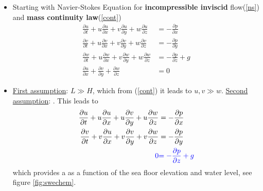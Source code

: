 \begin{frame}
\vspace{-3mm}
\begin{itemize}
\item<2-> Starting with Navier-Stokes Equation for \textbf{incompressible inviscid} flow(\ref{ns}) and \textbf{mass continuity law}(\ref{cont})
\begin{align}
\frac{\partial u}{\partial t} + u\frac{\partial u}{\partial x} + v\frac{\partial u}{\partial y} + w\frac{\partial u}{\partial z} &= - \frac{\partial p}{\partial x} \nonumber \\ 
\frac{\partial v}{\partial t} + u\frac{\partial v}{\partial x} + v\frac{\partial v}{\partial y} + w\frac{\partial v}{\partial z}&= - \frac{\partial p}{\partial y} \label{ns} \\ 
\frac{\partial w}{\partial t} + u\frac{\partial w}{\partial x} + v\frac{\partial w}{\partial y} + w\frac{\partial w}{\partial z} &= - \frac{\partial p}{\partial z} + g \nonumber\\[0.3cm]
\frac{\partial u}{\partial x} + \frac{\partial v}{\partial y} + \frac{\partial w}{\partial z} &= 0 \label{cont}
\end{align}

\item<3-> \underline{First assumption}: $L \gg H$, which from (\ref{cont}) it leads to $u,v\gg w$. \underline{Second assumption}: . This leads to
\begin{align}
\frac{\partial u}{\partial t} + u\frac{\partial u}{\partial x} + u\frac{\partial v}{\partial y} + u\frac{\partial w}{\partial z} &= - \frac{\partial p}{\partial x} \nonumber \nonumber \\ 
\frac{\partial v}{\partial t} + v\frac{\partial u}{\partial x} + v\frac{\partial v}{\partial y} + v\frac{\partial w}{\partial z}&= - \frac{\partial p}{\partial y} \nonumber \\ 
\textcolor{blue}{0} &\textcolor{blue}{ = - \frac{\partial p}{\partial z} + g} \label{press}
\end{align}
which provides a  as a function of the sea floor elevation and water level, {\tiny see figure \ref{fig:swechem}}.
\end{itemize}
\end{frame}
\clearpage


